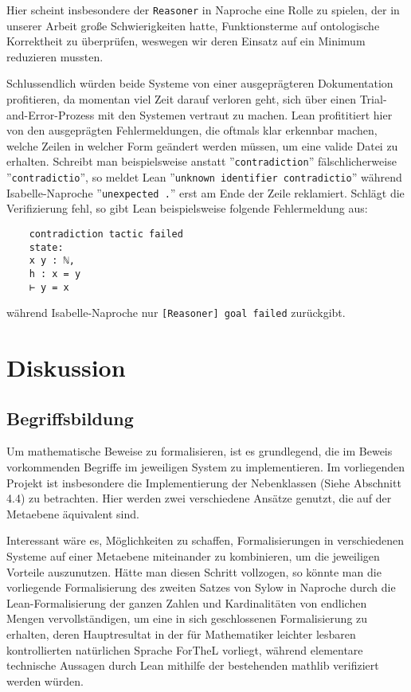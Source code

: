 \documentclass[a4paper,12pt]{scrartcl}
\begin{document}
Hier scheint insbesondere der \verb!Reasoner! in Naproche eine Rolle zu spielen, der in unserer Arbeit große Schwierigkeiten hatte, Funktionsterme auf ontologische Korrektheit zu überprüfen, weswegen wir deren Einsatz auf ein Minimum reduzieren mussten.

Schlussendlich würden beide Systeme von einer ausgeprägteren Dokumentation profitieren, da momentan viel Zeit darauf verloren geht, sich über einen Trial-and-Error-Prozess mit den Systemen vertraut zu machen.
Lean profititiert hier von den ausgeprägten Fehlermeldungen, die oftmals klar erkennbar machen, welche Zeilen in welcher Form geändert werden müssen, um eine valide Datei zu erhalten.
Schreibt man beispielsweise anstatt ''\verb!contradiction!'' fälschlicherweise ''\verb!contradictio!'', so meldet Lean ''\verb!unknown identifier contradictio!'' während Isabelle-Naproche ''\verb!unexpected .!'' erst am Ende der Zeile reklamiert. Schlägt die Verifizierung fehl, so gibt Lean beispielsweise folgende Fehlermeldung aus:
\begin{lstlisting}
    contradiction tactic failed
    state:
    x y : ℕ,
    h : x = y
    ⊢ y = x
\end{lstlisting}
während Isabelle-Naproche nur \verb![Reasoner] goal failed! zurückgibt.



\newpage

\section{Diskussion}

\subsection{Begriffsbildung}

Um mathematische Beweise zu formalisieren, ist es grundlegend, die im Beweis vorkommenden Begriffe im jeweiligen System zu implementieren. Im vorliegenden Projekt ist insbesondere die Implementierung der Nebenklassen (Siehe Abschnitt 4.4) zu betrachten. Hier werden zwei verschiedene Ansätze genutzt, die auf der Metaebene äquivalent sind.

Interessant wäre es, Möglichkeiten zu schaffen, Formalisierungen in verschiedenen Systeme auf einer Metaebene miteinander zu kombinieren, um die jeweiligen Vorteile auszunutzen. Hätte man diesen Schritt vollzogen, so könnte man die vorliegende Formalisierung des zweiten Satzes von Sylow in Naproche durch die Lean-Formalisierung der ganzen Zahlen und Kardinalitäten von endlichen Mengen vervollständigen, um eine in sich geschlossenen Formalisierung zu erhalten, deren Hauptresultat in der für Mathematiker leichter lesbaren kontrollierten natürlichen Sprache ForTheL vorliegt, während elementare technische Aussagen durch Lean mithilfe der bestehenden mathlib verifiziert werden würden.
\end{document}
